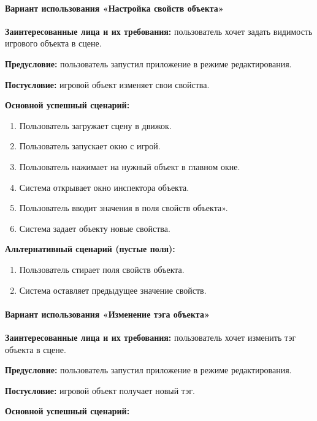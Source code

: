 \paragraph{Вариант использования «Настройка свойств объекта»}
\textbf{Заинтересованные лица и их требования:} пользователь хочет задать видимость игрового объекта в сцене.

\textbf{Предусловие:} пользователь запустил приложение в режиме редактирования.

\textbf{Постусловие:} игровой объект изменяет свои свойства.

\textbf{Основной успешный сценарий:}

\begin{enumerate}
	\item Пользователь загружает сцену в движок.
	
	\item Пользователь запускает окно с игрой.
	
	\item Пользователь нажимает на нужный объект в главном окне.
	
	\item Система открывает окно инспектора объекта.
	
	\item Пользователь вводит значения в поля свойств объекта».
	
	\item Система задает объекту новые свойства.
\end{enumerate}

\textbf{Альтернативный сценарий (пустые поля):}
\begin{enumerate}
	\item Пользователь стирает поля свойств объекта.
	
	\item Система оставляет предыдущее значение свойств.
\end{enumerate}

\paragraph{Вариант использования «Изменение тэга объекта»}
\textbf{Заинтересованные лица и их требования:} пользователь хочет изменить тэг объекта в сцене.

\textbf{Предусловие:} пользователь запустил приложение в режиме редактирования.

\textbf{Постусловие:} игровой объект получает новый тэг.

\textbf{Основной успешный сценарий:}

